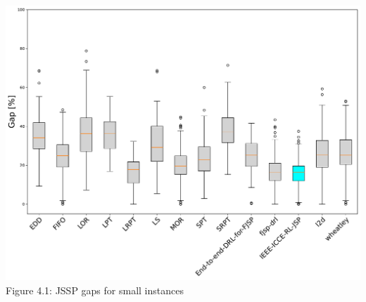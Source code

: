 \begin{center}
    \includegraphics[width=0.8\linewidth]{images/horizontal_boxplot_jssp_small.pdf}\\
    Figure 4.1: JSSP gaps for small instances
\end{center}

